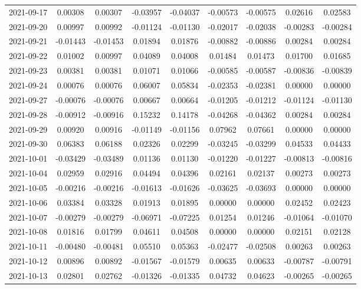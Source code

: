 \begin{footnotesize}
\begin{longtable}{lcccccccc}
2021-09-17 & 0.00308 & 0.00307 & -0.03957 & -0.04037 & -0.00573 & -0.00575 & 0.02616 & 0.02583 \\
2021-09-20 & 0.00997 & 0.00992 & -0.01124 & -0.01130 & -0.02017 & -0.02038 & -0.00283 & -0.00284 \\
2021-09-21 & -0.01443 & -0.01453 & 0.01894 & 0.01876 & -0.00882 & -0.00886 & 0.00284 & 0.00284 \\
2021-09-22 & 0.01002 & 0.00997 & 0.04089 & 0.04008 & 0.01484 & 0.01473 & 0.01700 & 0.01685 \\
2021-09-23 & 0.00381 & 0.00381 & 0.01071 & 0.01066 & -0.00585 & -0.00587 & -0.00836 & -0.00839 \\
2021-09-24 & 0.00076 & 0.00076 & 0.06007 & 0.05834 & -0.02353 & -0.02381 & 0.00000 & 0.00000 \\
2021-09-27 & -0.00076 & -0.00076 & 0.00667 & 0.00664 & -0.01205 & -0.01212 & -0.01124 & -0.01130 \\
2021-09-28 & -0.00912 & -0.00916 & 0.15232 & 0.14178 & -0.04268 & -0.04362 & 0.00284 & 0.00284 \\
2021-09-29 & 0.00920 & 0.00916 & -0.01149 & -0.01156 & 0.07962 & 0.07661 & 0.00000 & 0.00000 \\
2021-09-30 & 0.06383 & 0.06188 & 0.02326 & 0.02299 & -0.03245 & -0.03299 & 0.04533 & 0.04433 \\
2021-10-01 & -0.03429 & -0.03489 & 0.01136 & 0.01130 & -0.01220 & -0.01227 & -0.00813 & -0.00816 \\
2021-10-04 & 0.02959 & 0.02916 & 0.04494 & 0.04396 & 0.02161 & 0.02137 & 0.00273 & 0.00273 \\
2021-10-05 & -0.00216 & -0.00216 & -0.01613 & -0.01626 & -0.03625 & -0.03693 & 0.00000 & 0.00000 \\
2021-10-06 & 0.03384 & 0.03328 & 0.01913 & 0.01895 & 0.00000 & 0.00000 & 0.02452 & 0.02423 \\
2021-10-07 & -0.00279 & -0.00279 & -0.06971 & -0.07225 & 0.01254 & 0.01246 & -0.01064 & -0.01070 \\
2021-10-08 & 0.01816 & 0.01799 & 0.04611 & 0.04508 & 0.00000 & 0.00000 & 0.02151 & 0.02128 \\
2021-10-11 & -0.00480 & -0.00481 & 0.05510 & 0.05363 & -0.02477 & -0.02508 & 0.00263 & 0.00263 \\
2021-10-12 & 0.00896 & 0.00892 & -0.01567 & -0.01579 & 0.00635 & 0.00633 & -0.00787 & -0.00791 \\
2021-10-13 & 0.02801 & 0.02762 & -0.01326 & -0.01335 & 0.04732 & 0.04623 & -0.00265 & -0.00265 \\

\end{longtable}
\end{footnotesize}
